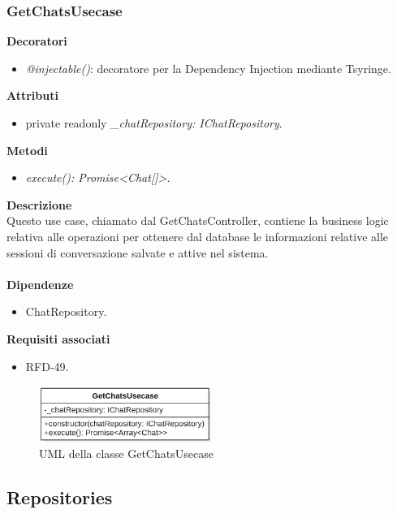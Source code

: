 \subsubsection{GetChatsUsecase}
\textbf{Decoratori}
\begin{itemize}
    \item \textit{@injectable()}: decoratore per la Dependency Injection mediante Tsyringe.
\end{itemize}
\textbf{Attributi}
\begin{itemize}
    \item private readonly \textit{\_chatRepository: IChatRepository}.
\end{itemize}
\textbf{Metodi}
\begin{itemize}
    \item \textit{execute(): Promise<Chat[]>}.
\end{itemize}
\textbf{Descrizione}\\
Questo use case, chiamato dal GetChatsController, contiene la business logic relativa alle operazioni per ottenere dal database le informazioni relative alle sessioni di conversazione salvate e attive nel sistema.\\ \\
\textbf{Dipendenze}
\begin{itemize}
    \item ChatRepository.
\end{itemize}
\textbf{Requisiti associati}
\begin{itemize}
    \item RFD-49.
\end{itemize}

\begin{figure}[h!]
    \centering  
    \includegraphics[width=0.5\textwidth]{GetChatsUsecase.png}
    \caption{UML della classe GetChatsUsecase}
\end{figure}

\subsection{Repositories} \label{subsec:repositories}
